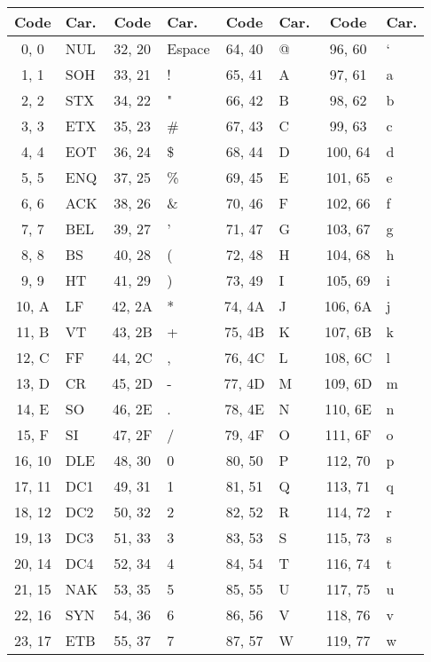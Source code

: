 \documentclass[12pt]{article}
\begin{document}
	\begin{center}
			\begin{tabular}{|c|l||c|l||c|l||c|l|}
			\hline
			Code & Car. & Code & Car. & Code & Car. & Code & Car.  \\
			\hline
			0, 0 & NUL & 32, 20 & Espace & 64, 40 & @ & 96, 60 & ` \\
			1, 1 & SOH & 33, 21 & ! & 65, 41 & A & 97, 61 & a \\
			2, 2 & STX & 34, 22 & " & 66, 42 & B & 98, 62 & b \\
			3, 3 & ETX & 35, 23 & \# & 67, 43 & C & 99, 63 & c \\
			4, 4 & EOT & 36, 24 & \$ & 68, 44 & D & 100, 64 & d \\
			5, 5 & ENQ & 37, 25 & \% & 69, 45 & E & 101, 65 & e \\
			6, 6 & ACK & 38, 26 & \& & 70, 46 & F & 102, 66 & f \\
			7, 7 & BEL & 39, 27 & ' & 71, 47 & G & 103, 67 & g \\
			8, 8 & BS & 40, 28 & ( & 72, 48 & H & 104, 68 & h \\
			9, 9 & HT & 41, 29 & ) & 73, 49 & I & 105, 69 & i \\
			10, A & LF & 42, 2A & * & 74, 4A & J & 106, 6A & j \\
			11, B & VT & 43, 2B & + & 75, 4B & K & 107, 6B & k \\
			12, C & FF & 44, 2C & , & 76, 4C & L & 108, 6C & l \\
			13, D & CR & 45, 2D & - & 77, 4D & M & 109, 6D & m \\
			14, E & SO & 46, 2E & . & 78, 4E & N & 110, 6E & n \\
			15, F & SI & 47, 2F & / & 79, 4F & O & 111, 6F & o \\
			16, 10 & DLE & 48, 30 & 0 & 80, 50 & P & 112, 70 & p \\
			17, 11 & DC1 & 49, 31 & 1 & 81, 51 & Q & 113, 71 & q \\
			18, 12 & DC2 & 50, 32 & 2 & 82, 52 & R & 114, 72 & r \\
			19, 13 & DC3 & 51, 33 & 3 & 83, 53 & S & 115, 73 & s \\
			20, 14 & DC4 & 52, 34 & 4 & 84, 54 & T & 116, 74 & t \\
			21, 15 & NAK & 53, 35 & 5 & 85, 55 & U & 117, 75 & u \\
			22, 16 & SYN & 54, 36 & 6 & 86, 56 & V & 118, 76 & v \\
			23, 17 & ETB & 55, 37 & 7 & 87, 57 & W & 119, 77 & w \\

\end{tabular}
\end{center}
\end{document}
